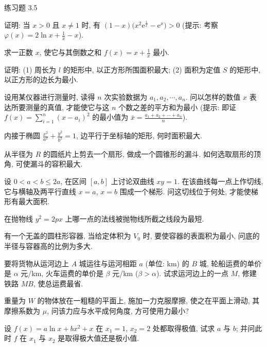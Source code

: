 \begin{exblock}{练习题 3.5}
  \item 证明: 当 $x>0$ 且 $x\neq 1$ 时, 有 $(1-x)\big(x^{2}\mathrm{e}^{\frac{1}{x}}-\mathrm{e}^{x}\big)>0$ (提示: 考察 $\varphi(x)=2\ln x+\frac{1}{x}-x$).

  \item 求一正数 $x$, 使它与其倒数之和 $f(x)=x+\frac{1}{x}$ 最小.

  \item 证明: (1) 周长为 $l$ 的矩形中, 以正方形所围面积最大; (2) 面积为定值 $S$ 的矩形中, 以正方形的边长为最小.

  \item 设用某仪器进行测量时, 读得 $n$ 次实验数据为 $a_{1},a_{2},\cdots,a_{n}$. 问以怎样的数值 $x$ 表达所要测量的真值, 才能使它与这 $n$ 个数之差的平方和为最小 (提示: 即证 $f(x)=\sum\limits_{i=1}^{n}(x-a_{i})^{2}$ 的最小值为 $\bar{x}=\frac{a_{1}+a_{2}+\cdots+a_{n}}{n}$).

  \item 内接于椭圆 $\frac{x^{2}}{a^{2}}+\frac{y^{2}}{b^{2}}=1$, 边平行于坐标轴的矩形, 何时面积最大.

  \item 从半径为 $R$ 的圆纸片上剪去一个扇形, 做成一个圆锥形的漏斗. 如何选取扇形的顶角, 可使漏斗的容积最大.

  \item 设 $0<a<b\leqslant 2a$, 在区间 $[a,b]$ 上讨论双曲线 $xy=1$. 在该曲线每一点上作切线, 它与横轴及两平行直线 $x=a$, $x=b$ 围成一个梯形. 问这切线位于何处, 才能使梯形有最大面积.

  \item 在抛物线 $y^{2}=2px$ 上哪一点的法线被抛物线所截之线段为最短.

  \item 有一个无盖的圆柱形容器, 当给定体积为 $V_{0}$ 时, 要使容器的表面积为最小, 问底的半径与容器高的比例为多大.

  \item 要将货物从运河边上 $A$ 城运往与运河相距 $a$ (单位: km) 的 $B$ 城, 轮船运费的单价是 $\alpha$ 元/km, 火车运费的单价是 $\beta$ 元/km ($\beta>\alpha$). 试求运河边上的一点 $M$, 修建铁路 $MB$, 使总运费最省.

  \item 重量为 $W$ 的物体放在一粗糙的平面上, 施加一力克服摩擦, 使之在平面上滑动, 其摩擦系数为 $\mu$, 问该力应与水平成何角度, 方可使用力最小?

  \item 设 $f(x)=a\ln x+bx^{2}+x$ 在 $x_{1}=1$, $x_{2}=2$ 处都取得极值, 试求 $a$ 与 $b$; 并问此时 $f$ 在 $x_{1}$ 与 $x_{2}$ 是取得极大值还是极小值.


\end{exblock}
